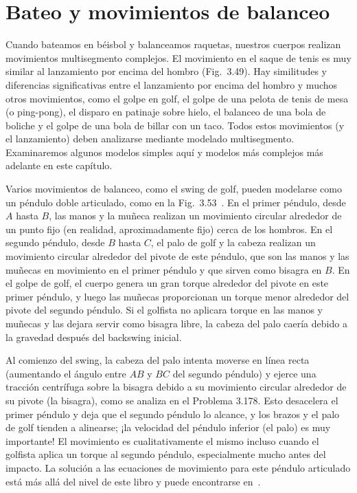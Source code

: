 \documentclass[12pt]{book}
\begin{document}
\section{Bateo y movimientos de balanceo}

Cuando bateamos en béisbol y balanceamos raquetas, nuestros cuerpos realizan movimientos multisegmento complejos. El movimiento en el saque de tenis es muy similar al lanzamiento por encima del hombro (Fig.~3.49). Hay similitudes y diferencias significativas entre el lanzamiento por encima del hombro y muchos otros movimientos, como el golpe en golf, el golpe de una pelota de tenis de mesa (o ping-pong), el disparo en patinaje sobre hielo, el balanceo de una bola de boliche y el golpe de una bola de billar con un taco. Todos estos movimientos (y el lanzamiento) deben analizarse mediante modelado multisegmento. Examinaremos algunos modelos simples aquí y modelos más complejos más adelante en este capítulo.

Varios movimientos de balanceo, como el swing de golf, pueden modelarse como un péndulo doble articulado, como en la Fig.~3.53~\cite{ref36,ref140}. En el primer péndulo, desde $A$ hasta $B$, las manos y la muñeca realizan un movimiento circular alrededor de un punto fijo (en realidad, aproximadamente fijo) cerca de los hombros. En el segundo péndulo, desde $B$ hasta $C$, el palo de golf y la cabeza realizan un movimiento circular alrededor del pivote de este péndulo, que son las manos y las muñecas en movimiento en el primer péndulo y que sirven como bisagra en $B$. En el golpe de golf, el cuerpo genera un gran torque alrededor del pivote en este primer péndulo, y luego las muñecas proporcionan un torque menor alrededor del pivote del segundo péndulo. Si el golfista no aplicara torque en las manos y muñecas y las dejara servir como bisagra libre, la cabeza del palo caería debido a la gravedad después del backswing inicial.

Al comienzo del swing, la cabeza del palo intenta moverse en línea recta (aumentando el ángulo entre $AB$ y $BC$ del segundo péndulo) y ejerce una tracción centrífuga sobre la bisagra debido a su movimiento circular alrededor de su pivote (la bisagra), como se analiza en el Problema 3.178. Esto desacelera el primer péndulo y deja que el segundo péndulo lo alcance, y los brazos y el palo de golf tienden a alinearse; ¡la velocidad del péndulo inferior (el palo) es muy importante! El movimiento es cualitativamente el mismo incluso cuando el golfista aplica un torque al segundo péndulo, especialmente mucho antes del impacto. La solución a las ecuaciones de movimiento para este péndulo articulado está más allá del nivel de este libro y puede encontrarse en~\cite{ref36}.
\end{document}
